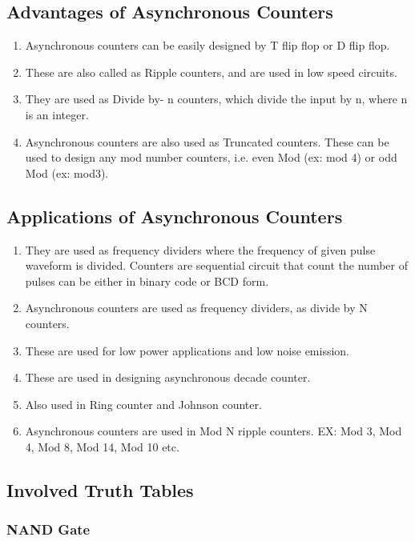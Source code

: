 \documentclass[11pt]{article}
\begin{document}
\subsection{Advantages of Asynchronous Counters}
\begin{enumerate}
	\item Asynchronous counters can be easily designed by T flip flop or D flip flop.
	\item These are also called as Ripple counters, and are used in low speed circuits.
	\item They are used as Divide by- n counters, which divide the input by n, where n is an integer.
	\item Asynchronous counters are also used as Truncated counters. These can be used to design any mod number counters, i.e. even Mod (ex: mod 4) or odd Mod (ex: mod3).
\end{enumerate}
\subsection{Applications of Asynchronous Counters}
\begin{enumerate}
	\item They are used as frequency dividers where the frequency of given pulse waveform is divided. Counters are sequential circuit that count the number of pulses can be either in binary code or BCD form.
	\item Asynchronous counters are used as frequency dividers, as divide by N counters.
	\item These are used for low power applications and low noise emission.
	\item These are used in designing asynchronous decade counter.
	\item Also used in Ring counter and Johnson counter.
	\item Asynchronous counters are used in Mod N ripple counters. EX: Mod 3, Mod 4, Mod 8, Mod 14, Mod 10 etc.
\end{enumerate}
\subsection{Involved Truth Tables}

\subsubsection{NAND Gate}
\end{document}
